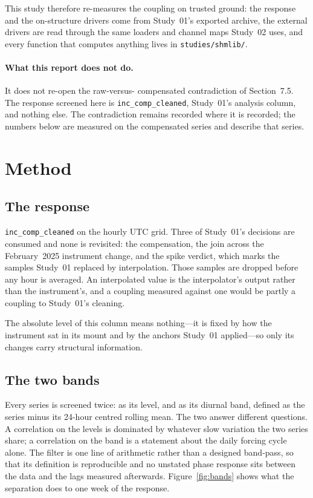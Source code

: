 \documentclass[11pt,a4paper]{article}
\begin{document}
This study therefore re-measures the coupling on trusted ground: the response
and the on-structure drivers come from Study~01's exported archive, the external
drivers are read through the same loaders and channel maps Study~02 uses, and
every function that computes anything lives in \texttt{studies/shmlib/}.

\paragraph{What this report does not do.} It does not re-open the raw-versus-%
compensated contradiction of Section~7.5. The response screened here is
\texttt{inc\_comp\_cleaned}, Study~01's analysis column, and nothing else. The
contradiction remains recorded where it is recorded; the numbers below are
measured on the compensated series and describe that series.

\section{Method}
\label{sec:method}

\subsection{The response}

\texttt{inc\_comp\_cleaned} on the hourly UTC grid. Three of Study~01's
decisions are consumed and none is revisited: the compensation, the join across
the February~2025 instrument change, and the spike verdict, which marks the
samples Study~01 replaced by interpolation. Those samples are dropped before any
hour is averaged. An interpolated value is the interpolator's output rather than
the instrument's, and a coupling measured against one would be partly a coupling
to Study~01's cleaning.

The absolute level of this column means nothing---it is fixed by how the
instrument sat in its mount and by the anchors Study~01 applied---so only its
changes carry structural information.

\subsection{The two bands}

Every series is screened twice: as its level, and as its diurnal band, defined
as the series minus its 24-hour centred rolling mean. The two answer different
questions. A correlation on the levels is dominated by whatever slow variation
the two series share; a correlation on the band is a statement about the daily
forcing cycle alone. The filter is one line of arithmetic rather than a designed
band-pass, so that its definition is reproducible and no unstated phase response
sits between the data and the lags measured afterwards. Figure~\ref{fig:bands}
shows what the separation does to one week of the response.
\end{document}

